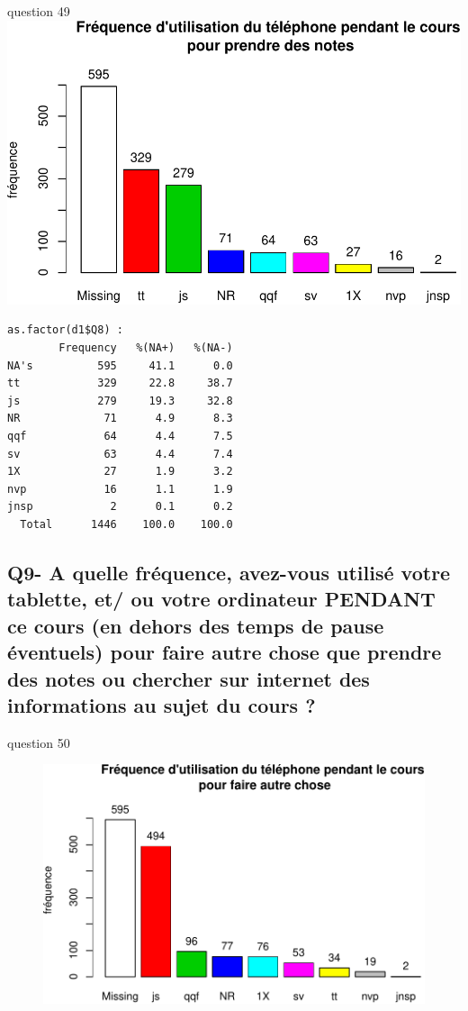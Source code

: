 \documentclass[]{article}
\begin{document}
question 49
\includegraphics{qs_etudiants_files/figure-latex/utilisatin3-1.pdf}

\begin{verbatim}
as.factor(d1$Q8) : 
        Frequency   %(NA+)   %(NA-)
NA's          595     41.1      0.0
tt            329     22.8     38.7
js            279     19.3     32.8
NR             71      4.9      8.3
qqf            64      4.4      7.5
sv             63      4.4      7.4
1X             27      1.9      3.2
nvp            16      1.1      1.9
jnsp            2      0.1      0.2
  Total      1446    100.0    100.0
\end{verbatim}

\subsection{Q9- A quelle fréquence, avez-vous utilisé votre tablette,
et/ ou votre ordinateur PENDANT ce cours (en dehors des temps de pause
éventuels) pour faire autre chose que prendre des notes ou chercher sur
internet des informations au sujet du cours
?}\label{q9--a-quelle-frequence-avez-vous-utilise-votre-tablette-et-ou-votre-ordinateur-pendant-ce-cours-en-dehors-des-temps-de-pause-eventuels-pour-faire-autre-chose-que-prendre-des-notes-ou-chercher-sur-internet-des-informations-au-sujet-du-cours}

question 50

\begin{figure}[htbp]
\centering
\includegraphics{qs_etudiants_files/figure-latex/utilisation4-1.pdf}
\end{figure}
\end{document}
